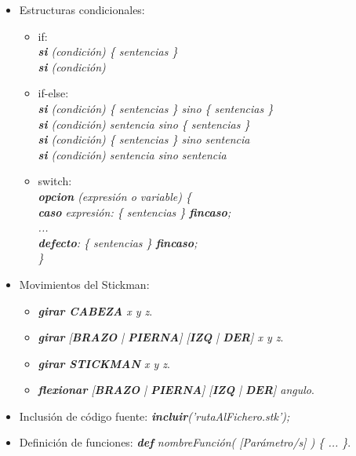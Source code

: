 \documentclass[a4paper,12pt]{article}
\begin{document}
\begin{itemize}
\begin{itemize}
          \end{itemize}
    \item Estructuras condicionales:
          \begin{itemize}
            \item if: \\
                  \hspace{1.5cm}\textit{\textbf{si} (condición) \{ sentencias \}} \\
                  \hspace{1.5cm}\textit{\textbf{si} (condición)}
            \item if-else: \\
                  \hspace{1.5cm}\textit{\textbf{si} (condición) \{ sentencias \} sino \{ sentencias \}}\\
                  \hspace{1.5cm}\textit{\textbf{si} (condición) sentencia sino \{ sentencias \}}\\
                  \hspace{1.5cm}\textit{\textbf{si} (condición) \{ sentencias \} sino sentencia}\\
                  \hspace{1.5cm}\textit{\textbf{si} (condición) sentencia sino sentencia}
            \item switch: \\
                  \hspace{1.5cm}\textit{\textbf{opcion} (expresión o variable) \{ \\
                           \hspace{1.7cm}\textbf{caso} expresión: \{ sentencias \} \textbf{fincaso}; \\
                           \hspace{1.7cm}... \\
                           \hspace{1.7cm}\textbf{defecto}: \{ sentencias \} \textbf{fincaso}; \\
                           \hspace{1.7cm}\}}
          \end{itemize}
    \item Movimientos del Stickman:
          \begin{itemize}
            \item \textit{\textbf{girar CABEZA} x y z}.
            \item \textit{\textbf{girar} [\textbf{BRAZO} | \textbf{PIERNA}] [\textbf{IZQ} | \textbf{DER}] x y z}.
            \item \textit{\textbf{girar STICKMAN} x y z}.
            \item \textit{\textbf{flexionar} [\textbf{BRAZO} | \textbf{PIERNA}] [\textbf{IZQ} | \textbf{DER}] angulo}.
          \end{itemize}
    \item Inclusión de código fuente: \textit{\textbf{incluir}('rutaAlFichero.stk');}
    \item Definición de funciones: \textit{\textbf{def} nombreFunción( [Parámetro/s] ) \{ ... \}}.
  \end{itemize}
\end{document}
